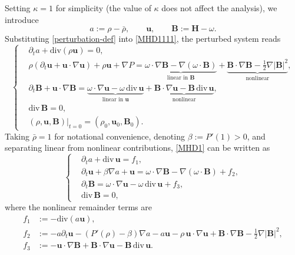 \documentclass[12pt, reqno]{amsart}
\numberwithin{equation}{section}
\numberwithin{equation}{section}
\numberwithin{equation}{section}
\numberwithin{equation}{section}
\theoremstyle{remark}
\def\u{ \mathbf{u} }
\def\b{ \mathbf{B} }
\begin{document}
Setting $\kappa=1$ for simplicity (the value of $\kappa$ does not affect
the analysis), we introduce
\begin{equation}\label{perturbation-def}
	a := \rho - \bar\rho, \qquad \mathbf{u}, \qquad \b := \mathbf{H}-\omega.
\end{equation}
Substituting \eqref{perturbation-def} into \eqref{MHD1111}, the perturbed system reads
\begin{equation}\label{MHD1}
	\left\{
	\begin{aligned}
		&\partial_t a + \mathrm{div}(\rho\mathbf{u}) = 0, \\[4pt]
		&\rho(\partial_t\mathbf{u} + \mathbf{u}\cdot\nabla\mathbf{u}) + \rho\mathbf{u}
		+ \nabla P
		= \underbrace{\omega\cdot\nabla\b
			- \nabla(\omega\cdot\b)}_{\text{linear in }\b}
		+ \underbrace{\b\cdot\nabla\b
			- \tfrac{1}{2}\nabla|\b|^2}_{\text{nonlinear}}, \\[4pt]
		&\partial_t\b + \mathbf{u}\cdot\nabla\b
		= \underbrace{\omega\cdot\nabla\mathbf{u} - \omega\,\mathrm{div}\,\mathbf{u}}_{\text{linear in }\mathbf{u}}
		+ \underbrace{\b\cdot\nabla\mathbf{u} - \b\,\mathrm{div}\,\mathbf{u}}_{\text{nonlinear}}, \\[4pt]
		&\mathrm{div}\,\b = 0, \\[4pt]
		&(\rho,\mathbf{u},\b)|_{t=0} = (\rho_0,\mathbf{u}_0,\b_0).
	\end{aligned}
	\right.
\end{equation}
Taking $\bar\rho=1$ for notational convenience, denoting $\beta:=P'(1)>0$,
and separating linear from nonlinear contributions, \eqref{MHD1} can be written as
\begin{equation}\label{LinNon}
	\left\{
	\begin{aligned}
		&\partial_t a + \mathrm{div}\,\mathbf{u} = f_1, \\[3pt]
		&\partial_t\mathbf{u} + \beta\nabla a + \mathbf{u}
		= \omega\cdot\nabla\b - \nabla(\omega\cdot\b) + f_2, \\[3pt]
		&\partial_t\b
		= \omega\cdot\nabla\mathbf{u} - \omega\,\mathrm{div}\,\mathbf{u} + f_3, \\[3pt]
		&\mathrm{div}\,\b = 0,
	\end{aligned}
	\right.
\end{equation}
where the nonlinear remainder terms are
\begin{equation}\label{nonlinear-terms}
	\begin{aligned}
		f_1 &:= -\mathrm{div}(a\mathbf{u}), \\
		f_2 &:= -a\partial_t\mathbf{u} - (P'(\rho)-\beta)\nabla a-a\u
		- \rho\,\mathbf{u}\cdot\nabla\mathbf{u}
		+ \b\cdot\nabla\b - \tfrac{1}{2}\nabla|\b|^2, \\
		f_3 &:= -\mathbf{u}\cdot\nabla\b
		+ \b\cdot\nabla\mathbf{u} - \b\,\mathrm{div}\,\mathbf{u}.
	\end{aligned}
\end{equation}
\end{document}
